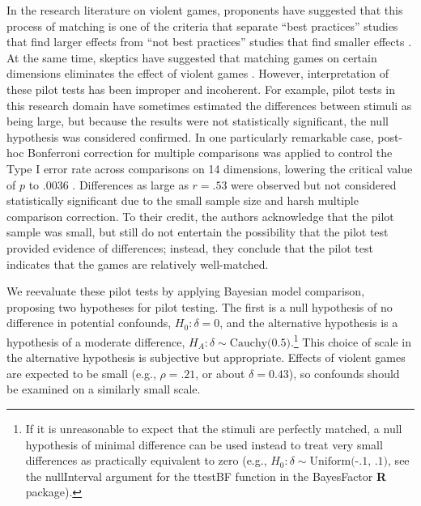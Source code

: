 \documentclass[man]{apa6}
\begin{document}

In the research literature on violent games, proponents have suggested that this process of matching is one of the criteria that separate ``best practices'' studies that find larger effects from ``not best practices'' studies that find smaller effects \citep{Anderson:etal:2010}. At the same time, skeptics have suggested that matching games on certain dimensions eliminates the effect of violent games \citep{Adachi:Willoughby:2011}. However, interpretation of these pilot tests has been improper and incoherent. For example, pilot tests in this research domain have sometimes estimated the differences between stimuli as being large, but because the results were not statistically significant, the null hypothesis was considered confirmed. In one particularly remarkable case, post-hoc Bonferroni correction for multiple comparisons was applied to control the Type I error rate across comparisons on 14 dimensions, lowering the critical value of $p$ to .0036 \citep{Arriaga:etal:2008}. Differences as large as $r = .53$ were observed but not considered statistically significant due to the small sample size and harsh multiple comparison correction. To their credit, the authors acknowledge that the pilot sample was small, but still do not entertain the possibility that the pilot test provided evidence of differences; instead, they conclude that the pilot test indicates that the games are relatively well-matched.

We reevaluate these pilot tests by applying Bayesian model comparison, proposing two hypotheses for pilot testing. The first is a null hypothesis of no difference in potential confounds, $H_0: \delta{} = 0$, and the alternative hypothesis is a hypothesis of a moderate difference, $H_A: \delta{} \sim{} \mbox{Cauchy(0.5)}$.\footnote{If it is unreasonable to expect that the stimuli are perfectly matched, a null hypothesis of minimal difference can be used instead to treat very small differences as practically equivalent to zero (e.g., $H_0: \delta{} \sim{} \mbox{Uniform(-.1, .1)}$, see the nullInterval argument for the ttestBF function in the BayesFactor {\bf R} package).} This choice of scale in the alternative hypothesis is subjective but appropriate. Effects of violent games are expected to be small (e.g., $\rho = .21$, or about $\delta = 0.43$), so confounds should be examined on a similarly small scale. 
\end{document}
